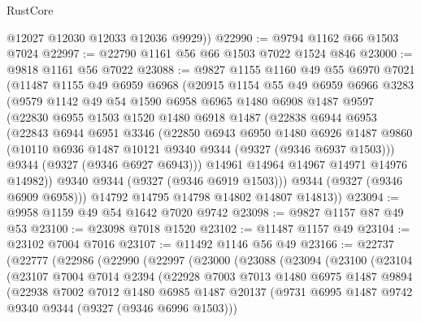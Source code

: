 \begin{lexlean}{RustCore}
\begin{coremodule}
        @12027
        @12030
        @12033
        @12036
        @9929))
@22990 := @9794 @1162 @66 @1503 @7024
@22997 := @22790 @1161 @56 @66 @1503 @7022 @1524 @846
@23000 := @9818 @1161 @56 @7022
@23088 := @9827
    @1155
    @1160
    @49
    @55
    @6970
    @7021
    (@11487
      @1155
      @49
      @6959
      @6968
      (@20915
        @1154
        @55
        @49
        @6959
        @6966
        @3283
        (@9579
          @1142
          @49
          @54
          @1590
          @6958
          @6965
          @1480
          @6908
          @1487
          @9597
          (@22830
            @6955
            @1503
            @1520
            @1480
            @6918
            @1487
            (@22838
              @6944
              @6953
              (@22843
                @6944
                @6951
                @3346
                (@22850
                  @6943
                  @6950
                  @1480
                  @6926
                  @1487
                  @9860
                  (@10110 @6936 @1487 @10121 @9340 @9344 (@9327 (@9346 @6937 @1503)))
                  @9344
                  (@9327 (@9346 @6927 @6943)))
                @14961
                @14964
                @14967
                @14971
                @14976
                @14982))
            @9340
            @9344
            (@9327 (@9346 @6919 @1503)))
          @9344
          (@9327 (@9346 @6909 @6958)))
        @14792
        @14795
        @14798
        @14802
        @14807
        @14813))
@23094 := @9958 @1159 @49 @54 @1642 @7020 @9742
@23098 := @9827 @1157 @87 @49 @53
@23100 := @23098 @7018 @1520
@23102 := @11487 @1157 @49
@23104 := @23102 @7004 @7016
@23107 := @11492 @1146 @56 @49
@23166 := @22737
    (@22777
      (@22986
        (@22990
          (@22997
            (@23000
              (@23088
                (@23094
                  (@23100
                    (@23104
                      (@23107
                        @7004
                        @7014
                        @2394
                        (@22928
                          @7003
                          @7013
                          @1480
                          @6975
                          @1487
                          @9894
                          (@22938
                            @7002
                            @7012
                            @1480
                            @6985
                            @1487
                            @20137
                            (@9731 @6995 @1487 @9742 @9340 @9344 (@9327 (@9346 @6996 @1503)))

\end{coremodule}
\end{lexlean}
